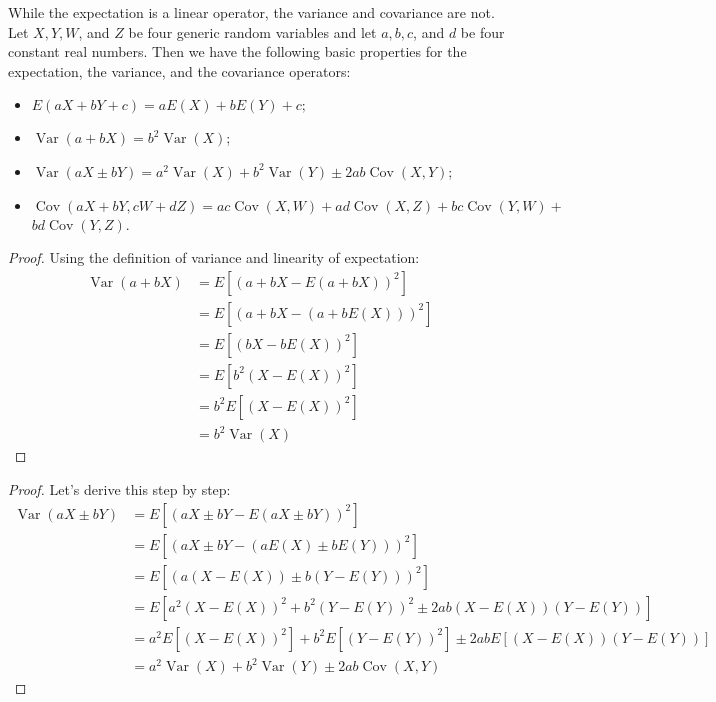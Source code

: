 While the expectation is a linear operator, the variance and covariance are not. Let $X, Y, W$, and $Z$ be four generic random variables and let $a, b, c$, and $d$ be four constant real numbers. Then we have the following basic properties for the expectation, the variance, and the covariance operators:

\begin{itemize}
  \item $E(a X+b Y+c)=a E(X)+b E(Y)+c ;$
  \item $\operatorname{Var}(a+b X)=b^{2} \operatorname{Var}(X)$;
  \item $\operatorname{Var}(a X \pm b Y)=a^{2} \operatorname{Var}(X)+b^{2} \operatorname{Var}(Y) \pm 2 a b \operatorname{Cov}(X, Y)$;
  \item $\operatorname{Cov}(a X+b Y, c W+d Z)=a c \operatorname{Cov}(X, W)+a d \operatorname{Cov}(X, Z)+b c \operatorname{Cov}(Y, W)+$ $b d \operatorname{Cov}(Y, Z)$.
\end{itemize}

\begin{proof}
        Using the definition of variance and linearity of expectation:
        \[ \begin{aligned}
        \operatorname{Var}(a + bX) &= E[(a + bX - E(a + bX))^2] \\
        &= E[(a + bX - (a + bE(X)))^2] \\
        &= E[(bX - bE(X))^2] \\
        &= E[b^2(X - E(X))^2] \\
        &= b^2E[(X - E(X))^2] \\
        &= b^2\operatorname{Var}(X)
        \end{aligned} \]
    \end{proof}

\begin{proof}
        Let's derive this step by step:
        \[ \begin{aligned}
        \operatorname{Var}(aX \pm bY) &= E[(aX \pm bY - E(aX \pm bY))^2] \\
        &= E[(aX \pm bY - (aE(X) \pm bE(Y)))^2] \\
        &= E[(a(X - E(X)) \pm b(Y - E(Y)))^2] \\
        &= E[a^2(X - E(X))^2 + b^2(Y - E(Y))^2 \pm 2ab(X - E(X))(Y - E(Y))] \\
        &= a^2E[(X - E(X))^2] + b^2E[(Y - E(Y))^2] \pm 2abE[(X - E(X))(Y - E(Y))] \\
        &= a^2\operatorname{Var}(X) + b^2\operatorname{Var}(Y) \pm 2ab\operatorname{Cov}(X,Y)
        \end{aligned} \]
    \end{proof}

